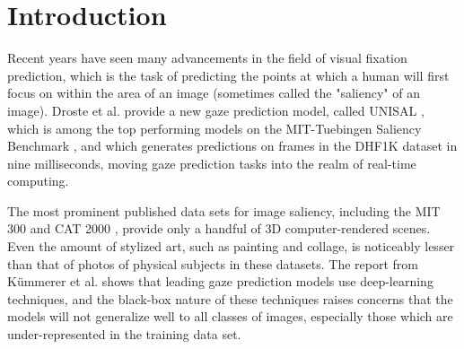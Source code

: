 \documentclass[sigconf]{acmart}
\begin{document}
\begin{abstract}
Recent advancements have shown increasingly accurate and fast visual gaze prediction models, which might now be feasible for real-time scenarios. These gaze prediction models would allow a program to infer where a user might focus on in an rendered scene, and might allow unique program behavior, rendering optimizations based on perception, or modelling of the user's visual attention, without requiring direct eye-tracking hardware. Current state-of-the-art models use deep learning techniques, and most published image data sets for training are biased towards photography, at the expense of computer-rendered scenes, especially those with stylized subjects. We raise concerns over the generalizability of state-of-the-art models. We study a number of digital image transformations on existing datasets, using them as a reference point for what various rendering techniques or stylization effects might have on gaze prediction models. Our findings show that state-of-the-art models perform significantly worse on common image transformations. Our experiments reveal no significant, computable indicators of loss in accuracy, meaning more human gaze distribution data must be gathered in order to train and validate the generalizability of gaze prediction models.
\end{abstract}

\maketitle

\section{Introduction}
Recent years have seen many advancements in the field of visual fixation prediction, which is the
task of predicting the points at which a human will first focus on within the area of an image
(sometimes called the "saliency" of an image). Droste et al. provide a new gaze prediction
model, called UNISAL \cite{unisal}, which is among the top performing models on the MIT-Tuebingen
Saliency Benchmark \cite{mit-tuebingen}, and which generates predictions on frames in the DHF1K
\cite{dhf1k} dataset in nine milliseconds, moving gaze prediction tasks into the realm of real-time
computing.

The most prominent published data sets for image saliency, including the MIT 300 \cite{mit300} and
CAT 2000 \cite{cat2000}, provide only a handful of 3D computer-rendered scenes. Even the amount of
stylized art, such as painting and collage, is noticeably lesser than that of photos of
physical subjects in these datasets. The report from Kümmerer et al. \cite{annurev-vision} shows that
leading gaze prediction models use deep-learning techniques, and the black-box nature of these
techniques raises concerns that the models will not generalize well to all classes of images,
especially those which are under-represented in the training data set.
\end{document}
